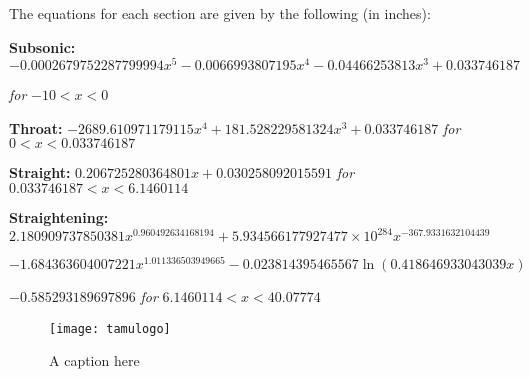 The equations for each section are given by the following (in inches):

{\fontsize{10.5}{15}\selectfont
\textbf{Subsonic:} $-0.0002679752287799994x^5 - 0.0066993807195x^4 - 0.04466253813x^3 + 0.033746187$ 

\qquad \qquad \quad \textit{for} $-10 < x < 0$

\textbf{Throat:} $-2689.610971179115x^4 + 181.528229581324x^3 + 0.033746187$ \textit{for} $0 < x < 0.033746187$

\textbf{Straight:} $0.206725280364801x + 0.030258092015591$ \textit{for} $0.033746187 < x < 6.1460114$

\textbf{Straightening:} $2.180909737850381x^{0.960492634168194} + 5.934566177927477 \times 10^{284} x^{-367.9331632104439}$ 

\qquad \qquad \qquad $- 1.684363604007221x^{1.011336503949665} - 0.023814395465567 \ln(0.418646933043039x)$

\qquad \qquad \qquad $- 0.585293189697896$ \textit{for} $6.1460114 < x < 40.07774$
}



\begin{figure}[ht]
    \centering
    \texttt{[image: tamulogo]}
    \caption{A caption here}
\end{figure}


